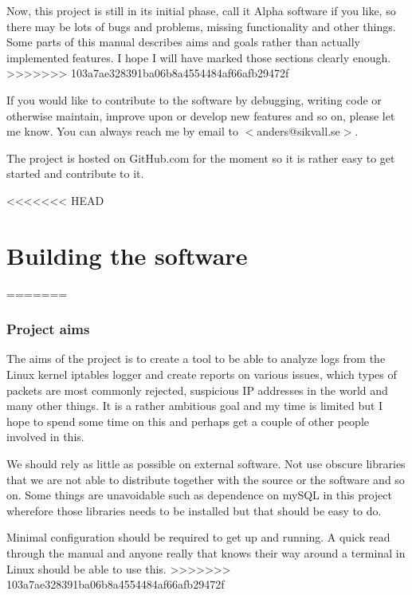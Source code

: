 \documentclass[english,twoside,openright,a4paper,12pt]{article}
\begin{document}
Now, this project is still in its initial phase, call it Alpha software if you like, so there may be lots of bugs and problems, missing functionality and other things. Some parts of this manual describes aims and goals rather than actually implemented features. I hope I will have marked those sections clearly enough.
>>>>>>> 103a7ae328391ba06b8a4554484af66afb29472f

If you would like to contribute to the software by debugging, writing code or otherwise maintain, improve upon or develop new features and so on, please let me know. You can always reach me by email to $<$anders@sikvall.se$>$.

The project is hosted on GitHub.com for the moment so it is rather easy to get started and contribute to it.

<<<<<<< HEAD










\chapter{Building the software}
=======
\subsection{Project aims}

The aims of the project is to create a tool to be able to analyze logs from the Linux kernel iptables logger and create reports on various issues, which types of packets are most commonly rejected, suspicious IP addresses in the world and many other things. It is a rather ambitious goal and my time is limited but I hope to spend some time on this and perhaps get a couple of other people involved in this.

We should rely as little as possible on external software. Not use obscure libraries that we are not able to distribute together with the source or the software and so on. Some things are unavoidable such as dependence on mySQL in this project wherefore those libraries needs to be installed but that should be easy to do.

Minimal configuration should be required to get up and running. A quick read through the manual and anyone really that knows their way around a terminal in Linux should be able to use this.
>>>>>>> 103a7ae328391ba06b8a4554484af66afb29472f
\end{document}
